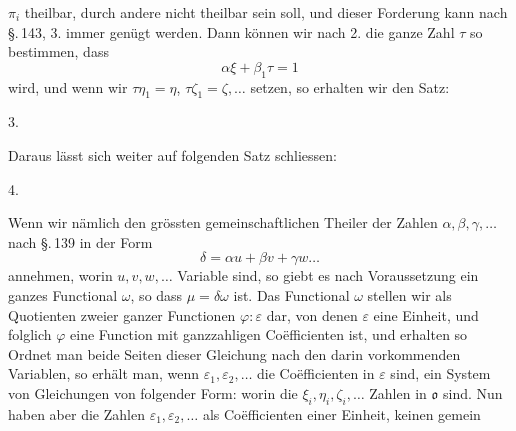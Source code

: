 $\pi_i$ theilbar, durch andere nicht theilbar sein soll, und dieser
Forderung kann nach \S.\,143, 3. immer genügt werden. Dann können wir
nach 2. die ganze Zahl $\tau$ so bestimmen, dass
\[
\alpha\xi + \beta_1\tau = 1
\]
wird, und wenn wir $\tau\eta_1 = \eta$, $\tau\zeta_1 = \zeta, \ldots$
setzen, so erhalten wir den Satz:

3. 

Daraus lässt sich weiter auf folgenden Satz schliessen:

4. 

Wenn wir nämlich den grössten gemeinschaftlichen Theiler der Zahlen
$\alpha, \beta, \gamma, \ldots$ nach \S.\,139 in der Form
\[
\delta = \alpha u + \beta v + \gamma w \ldots
\]
annehmen, worin $u, v, w, \ldots$ Variable sind, so giebt es nach
Voraussetzung ein ganzes Functional $\omega$, so dass $\mu = \delta
\omega$ ist. Das Functional $\omega$ stellen wir als Quotienten zweier
ganzer Functionen $\varphi : \varepsilon$ dar, von denen $\varepsilon$
eine Einheit, und folglich $\varphi$ eine Function mit ganzzahligen
Co\"efficienten ist, und erhalten so
Ordnet man beide Seiten dieser Gleichung nach den darin vorkommenden
Variablen, so erhält man, wenn $\varepsilon_1, \varepsilon_2, \ldots$
die Co\"efficienten in $\varepsilon$ sind, ein System von Gleichungen
von folgender Form:
worin die $\xi_i, \eta_i, \zeta_i, \ldots$ Zahlen in $\mathfrak{o}$ sind.
Nun haben aber die Zahlen $\varepsilon_1, \varepsilon_2, \ldots$ als
Co\"efficienten einer Einheit, keinen gemein
